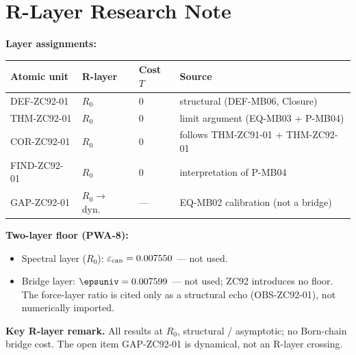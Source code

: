 \documentclass[12pt, a4paper]{article}
\renewcommand{\epscan}{\varepsilon_{\rm can}}   %
\begin{document}
\section{R-Layer Research Note}
\label{sec:rlayer-zc92}
\begin{layerbox}[title={R-Layer Assignments for ZC92}]

\textbf{Layer assignments:}

{\small\renewcommand{\arraystretch}{1.25}
\begin{center}
\begin{tabular}{@{}llll@{}}
\toprule
Atomic unit & R-layer & Cost $T$ & Source \\
\midrule
DEF-ZC92-01 & $R_0$ & $0$ & structural (DEF-MB06, Closure) \\
THM-ZC92-01 & $R_0$ & $0$ & limit argument (EQ-MB03 + P-MB04) \\
COR-ZC92-01 & $R_0$ & $0$ & follows THM-ZC91-01 + THM-ZC92-01 \\
FIND-ZC92-01 & $R_0$ & $0$ & interpretation of P-MB04 \\
GAP-ZC92-01 & $R_0{\to}$ dyn. & --- & EQ-MB02 calibration (not a bridge) \\
\bottomrule
\end{tabular}
\end{center}}

\textbf{Two-layer floor (PWA-8):}
\begin{itemize}[leftmargin=2em, noitemsep]
  \item Spectral layer ($R_0$): $\epscan=0.007550$ --- not used.
  \item Bridge layer: $\epsuniv=0.007599$ --- not used; ZC92 introduces no
    floor. The force-layer ratio is cited only as a structural echo
    (OBS-ZC92-01), not numerically imported.
\end{itemize}

\textbf{Key R-layer remark.} All results at $R_0$, structural / asymptotic;
no Born-chain bridge cost. The open item GAP-ZC92-01 is dynamical, not an
R-layer crossing.
\end{layerbox}

\end{document}
